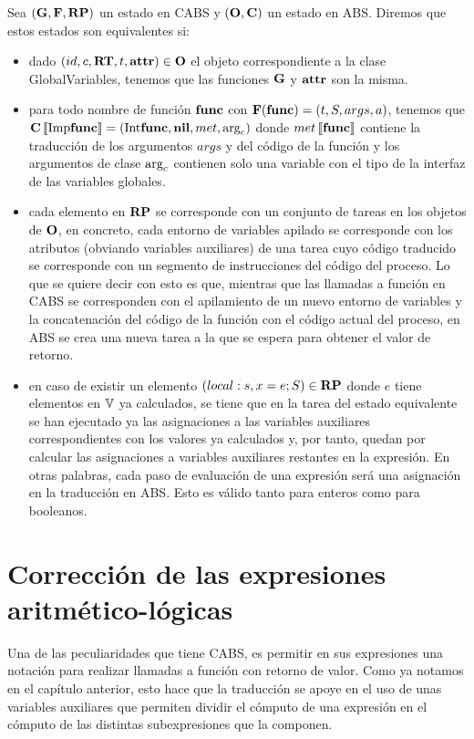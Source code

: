 Sea $(\mathbf{G}, \mathbf{F}, \textbf{RP})$ un estado en CABS y $(\mathbf{O}, \mathbf{C})$ un estado en ABS. Diremos que estos estados son equivalentes si:
\begin{itemize}
\item dado $(id, c, \textbf{RT}, t, \textbf{attr}) \in \mathbf{O}$ el objeto correspondiente a la clase GlobalVariables, tenemos que las funciones $\mathbf{G}$ y $\textbf{attr}$ son la misma.
\item para todo nombre de función $\textbf{func}$ con $\mathbf{F}(\textbf{func}) = (t, S, args, a)$, tenemos que $\mathbf{C}\left\llbracket \text{Imp}\textbf{func} \right\rrbracket = (\text{Int}\textbf{func}, \textbf{nil}, met, \text{arg}_c)$ donde $met\left\llbracket \textbf{func} \right\rrbracket$ contiene la traducción de los argumentos $args$ y del código de la función y los argumentos de clase $\text{arg}_c$ contienen solo una variable con el tipo de la interfaz de las variables globales.
\item cada elemento en $\textbf{RP}$ se corresponde con un conjunto de tareas en los objetos de $\mathbf{O}$, en concreto, cada entorno de variables apilado se corresponde con los atributos (obviando variables auxiliares) de una tarea cuyo código traducido se corresponde con un segmento de instrucciones del código del proceso. Lo que se quiere decir con esto es que, mientras que las llamadas a función en CABS se corresponden con el apilamiento de un nuevo entorno de variables y la concatenación del código de la función con el código actual del proceso, en ABS se crea una nueva tarea a la que se espera para obtener el valor de retorno.
\item en caso de existir un elemento $(local:s, x = e\mbox{;\,} S) \in \textbf{RP}$ donde $e$ tiene elementos en $\mathbb{V}$ ya calculados, se tiene que en la tarea del estado equivalente se han ejecutado ya las asignaciones a las variables auxiliares correspondientes con los valores ya calculados y, por tanto, quedan por calcular las asignaciones a variables auxiliares restantes en la expresión. En otras palabras, cada paso de evaluación de una expresión será una asignación en la traducción en ABS. Esto es válido tanto para enteros como para booleanos.
\end{itemize}
\section{Corrección de las expresiones aritmético-lógicas}
Una de las peculiaridades que tiene CABS, es permitir en sus expresiones una notación para realizar llamadas a función con retorno de valor. Como ya notamos en el capítulo anterior, esto hace que la traducción se apoye en el uso de unas variables auxiliares que permiten dividir el cómputo de una expresión en el cómputo de las distintas subexpresiones que la componen.\\

